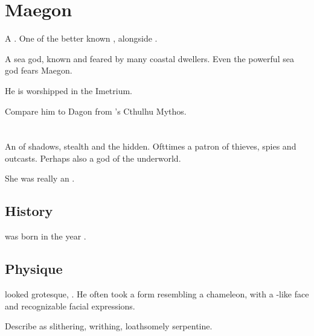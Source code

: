 \section{Maegon}
A \nagalord. 
One of the better known \nagalords, alongside . 

A sea god, known and feared by many coastal dwellers. 
Even the powerful sea god  fears Maegon. 

He is worshipped in the Imetrium. 

Compare him to Dagon from \HPLovecraft's Cthulhu Mythos. 















\section{\Nasshikerr}
\index{\Nasshikerr}
An  of shadows, stealth and the hidden. 
Ofttimes a patron of thieves, spies and outcasts. 
Perhaps also a god of the underworld.

She was really an \ophidian.









\subsection{History}
\Nasshikerr was born in the year .









\subsection{Physique}
\Nasshikerr looked grotesque, .
He often took a form resembling a chameleon, with a \scatha-like face and recognizable facial expressions. 

Describe \Nasshikerr as slithering, writhing, loathsomely serpentine.









